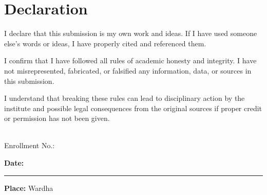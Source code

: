 \chapter*{Declaration}
\justifying
I declare that this submission is my own work and ideas. If I have used someone else’s words or ideas, I have properly cited and referenced them.

I confirm that I have followed all rules of academic honesty and integrity. I have not misrepresented, fabricated, or falsified any information, data, or sources in this submission.

I understand that breaking these rules can lead to disciplinary action by the institute and possible legal consequences from the original sources if proper credit or permission has not been given.

\vspace{36pt}
\begin{flushright}
\textbf{\StudentName}\\
Enrollment No.: \Enrollment
\end{flushright}

\vspace{16pt}
\textbf{Date:} \rule{3.2cm}{0.4pt}\par
\textbf{Place:} Wardha
\clearpage
